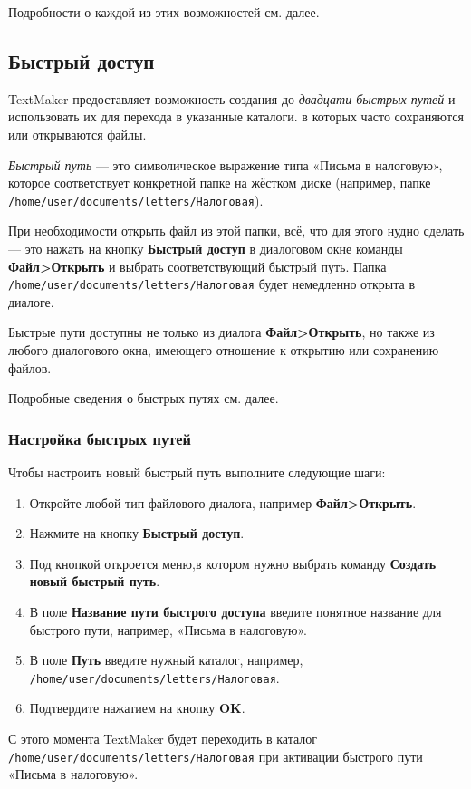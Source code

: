 ﻿\documentclass[a4paper,10pt]{article}
\begin{document}
Подробности о каждой из этих возможностей см. далее.

\subsection{Быстрый доступ} \label{sec:быстрыйдоступ}
TextMaker предоставляет возможность создания до \textit{двадцати быстрых путей} и использовать их для перехода в указанные каталоги. в которых часто сохраняются или открываются файлы.

\textit{Быстрый путь} — это символическое выражение типа «Письма в налоговую», которое соответствует конкретной папке на жёстком диске (например, папке \texttt{/home/user/documents/letters/Налоговая}).

При необходимости открыть файл из этой папки, всё, что для этого нудно сделать — это нажать на кнопку \textbf{Быстрый доступ} в диалоговом окне команды \textbf{Файл>Открыть} и выбрать соответствующий быстрый путь. Папка \texttt{/home/user/documents/letters/Налоговая} будет немедленно открыта в диалоге.

Быстрые пути доступны не только из диалога \textbf{Файл>Открыть}, но также из любого диалогового окна, имеющего отношение к открытию или сохранению файлов.

Подробные сведения о быстрых путях см. далее.

\subsubsection{Настройка быстрых путей}
Чтобы настроить новый быстрый путь выполните следующие шаги:
\begin{enumerate}
 \item Откройте любой тип файлового диалога, например \textbf{Файл>Открыть}.
 \item Нажмите на кнопку \textbf{Быстрый доступ}.
 \item Под кнопкой откроется меню,в котором нужно выбрать команду \textbf{Создать новый быстрый путь}.
 \item В поле \textbf{Название пути быстрого доступа} введите понятное название для быстрого пути, например, «Письма в налоговую».
 \item В поле \textbf{Путь} введите нужный каталог, например, \texttt{/home/user/documents/letters/Налоговая}.
 \item Подтвердите нажатием на кнопку \textbf{OK}.
\end{enumerate}

С этого момента TextMaker будет переходить в каталог \texttt{/home/user/documents/letters/Налоговая} при активации быстрого пути «Письма в налоговую».
\end{document}
